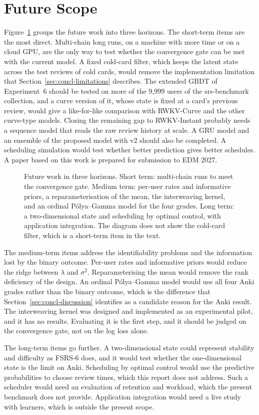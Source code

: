 \section{Future Scope}
\label{sec:concl-future}

Figure~\ref{fig:tk_roadmap} groups the future work into three horizons. The short-term items are the most
direct. Multi-chain long runs, on a machine with more time or on a cloud GPU, are the only way to test whether the
convergence gate can be met with the current model. A fixed cold-card filter, which keeps the latent state across
the test reviews of cold cards, would remove the implementation limitation that Section~\ref{sec:concl-limitations}
describes. The extended GBDT of Experiment~6 should be tested on more of the 9,999 users of the srs-benchmark collection, and a curve version of it, whose state is fixed at a card's previous review, would give a like-for-like comparison with RWKV-Curve and the other curve-type models. Closing the remaining gap to RWKV-Instant probably needs a sequence model that reads the raw review history at scale. A GRU model and an ensemble of the proposed model with v2 should also be completed. A scheduling simulation would test whether better prediction gives better schedules. A paper based on this work is prepared for submission to EDM 2027.

\begin{figure}[htbp]
  \centering
  
  \caption[Future work]{Future work in three horizons. Short term: multi-chain runs to meet the convergence gate. Medium term:
    per-user rates and informative priors, a reparameterisation of the mean, the interweaving kernel, and an
    ordinal P\'olya--Gamma model for the four grades. Long term: a two-dimensional state and scheduling by optimal
    control, with application integration. The diagram does not show the cold-card filter, which is a short-term item
    in the text.}
  \label{fig:tk_roadmap}
\end{figure}

The medium-term items address the identifiability problems and the information lost by the binary outcome. Per-user
rates and informative priors would reduce the ridge between $\lambda$ and $\sigma^2$. Reparameterising the mean would
remove the rank deficiency of the design. An ordinal Pólya--Gamma model would use all four Anki grades rather than the
binary outcome, which is the difference that Section~\ref{sec:concl-discussion} identifies as a candidate reason for the
Anki result. The interweaving kernel was designed and implemented as an experimental pilot, and it has no results.
Evaluating it is the first step, and it should be judged on the convergence gate, not on the log loss alone.

The long-term items go further. A two-dimensional state could represent stability and difficulty as FSRS-6 does, and it
would test whether the one-dimensional state is the limit on Anki. Scheduling by optimal control would use the predictive
probabilities to choose review times, which this report does not address. Such a scheduler would need an evaluation of
retention and workload, which the present benchmark does not provide. Application integration would need a live study with learners, which is outside the present scope.
